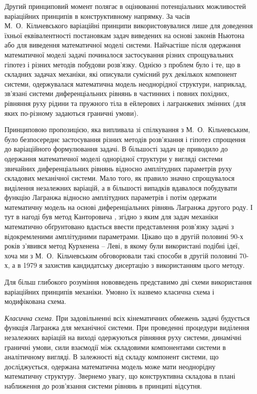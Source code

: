 \documentclass[11pt, reqno]{amsart}
\begin{document}
Другий принциповий момент полягає в оцінюванні потенціальних можливостей варіаційних принципів в конструктивному напрямку. За часів М.~О.~Кільчевського варіаційні принципи використовувалися лише для доведення їхньої еквівалентності постановкам задач виведених на основі законів Ньютона або для виведення математичної моделі системи. Найчастіше після одержання математичної моделі задачі починалося застосування різних спрощувальних гіпотез і різних методів побудови розв'язку. Однією з проблем було і те, що в складних задачах механіки, які описували сумісний рух декількох компонент системи, одержувалася математична модель неоднорідної структури, наприклад, зв'язані системи диференціальних рівнянь в частинних і повних похідних, рівняння руху рідини та пружного тіла в ейлерових і лагранжевих змінних (для яких по-різному задаються граничні умови).

Принциповою пропозицією, яка випливала зі спілкування з М.~О.~Кільчевським, було безпосереднє застосування різних методів розв'язання і гіпотез спрощення до варіаційного формулювання задачі. В більшості задач це приводило до одержання математичної моделі однорідної структури у вигляді системи звичайних диференціальних рівнянь відносно амплітудних параметрів руху складових механічної системи. Мало того, як правило значно спрощувалося виділення незалежних варіацій, а в більшості випадків вдавалося побудувати функцію Лагранжа відносно амплітудних параметрів і потім одержати математичну модель на основі диференціальних рівнянь Лагранжа другого роду. І тут в нагоді був метод Канторовича \cite{Kan}, згідно з яким для задач механіки математично обґрунтовано вдається ввести представлення розв'язку задачі з відокремленими амплітудними параметрами. Цікаво що в другій половині 90-х років з'явився метод Курхенена -- Леві, в якому були використані подібні ідеї, хоча ми з М.~О.~Кільчевським обговорювали такі способи в другій половині 70-х, а в 1979 я захистив кандидатську дисертацію з використанням цього методу.

Для більш глибокого розуміння нововведень представимо дві схеми використання варіаційних принципів механіки. Умовно їх назвемо класична схема і модифікована схема.

{\it Класична схема}. При задовільненні всіх кінематичних обмежень задачі будується функція Лагранжа для механічної системи. При проведенні процедури виділення незалежних варіацій на виході одержуються рівняння руху системи, динамічні граничні умови, сили взаємодії між складовими компонентами системи в аналітичному вигляді. В залежності від складу компонент системи, що досліджується, одержана математична модель може мати неоднорідну математичну структуру. Звернемо увагу, що конструктивна складова в плані наближення до розв'язання системи рівнянь в принципі відсутня.
\end{document}
